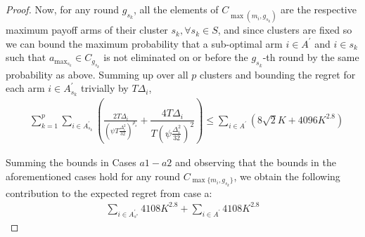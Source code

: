 \begin{proof}
  Now, for any round $g_{s_{k}}$, all the elements of $C_{\max(m_{i},g_{s_{k}})}$ are the respective maximum payoff arms of their cluster $s_{k}, \forall s_{k}\in S$, and since clusters are fixed so we can bound the maximum probability that a sub-optimal arm ${i}\in A^{'}$  and ${i}\in s_{k}$ such that $a_{\max_{s_{k}}}\in C_{g_{s_{k}}}$ is not eliminated on or before the $g_{s_{k}}$-th round by the same probability as above. Summing up over all $p$ clusters and bounding the regret for each arm $i\in A_{s_{k}}^{'}$ trivially by $T\Delta_{i}$,
 \begin{align*}
 &\sum_{k=1}^{p}\sum_{i\in A_{s_{k}}^{'}}\left(\frac{2T\Delta_{i}}{(\psi T\frac{\Delta_{i}^{2}}{32})^{\rho_{s}}} + \dfrac{4T\Delta_{i}}{T(\psi \frac{\Delta_{i}^{2}}{32})^2}\right)\leq \sum_{i\in A^{'}}\left(8\sqrt{2} K + 4096 K^{2.8}\right)
 \end{align*}


Summing the bounds in Cases $a1-a2$ and observing that the bounds in the aforementioned cases hold for any round $C_{\max \lbrace m_i,g_{s_k}\rbrace}$, we obtain the following contribution to the expected regret from case a:
\begin{align*}
 \sum_{i\in A_{s^*}^{'}} 4108 K^{2.8} + \sum_{i\in A^{'}} 4108 K^{2.8}
\end{align*}


\end{proof}
